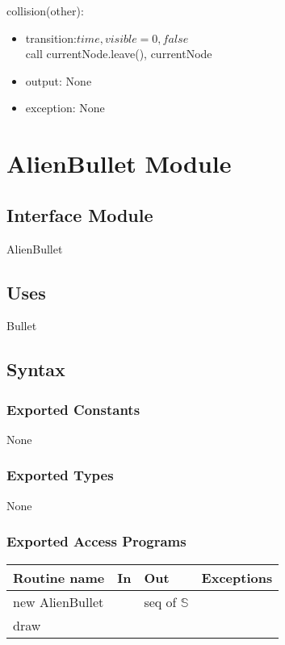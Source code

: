 \documentclass[12pt]{article}
\begin{document}
\noindent collision(other):
\begin{itemize}
\item transition:$time , visible = 0, false$\\
call currentNode.leave(), currentNode\\
\item output: None
\item exception: None
\end{itemize}

\newpage

\section* {AlienBullet Module}

\subsection*{Interface Module}

AlienBullet

\subsection* {Uses}

Bullet

\subsection* {Syntax}

\subsubsection* {Exported Constants}

None

\subsubsection* {Exported Types}

None 

\subsubsection* {Exported Access Programs}

\begin{tabular}{| l | l | l | p{5cm} |}
\hline
\textbf{Routine name} & \textbf{In} & \textbf{Out} & \textbf{Exceptions}\\
\hline
new AlienBullet & ~  & seq of $\mathbb{S}$ & ~\\
\hline
draw & ~ & ~ & ~\\
\hline


\end{tabular}
\end{document}
